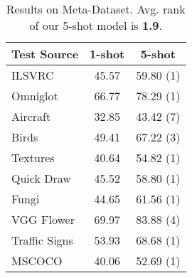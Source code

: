 \documentclass[runningheads]{llncs}
\begin{document}
\begin{table}
\centering
\caption{Results on Meta-Dataset. Avg. rank of our 5-shot model is \textbf{1.9}.}
\begin{tabular}{lcc}
\toprule
Test Source & 1-shot & 5-shot  \\ \midrule
{ILSVRC}          & {45.57}           & {59.80 (1)}                            \\
{Omniglot}        & {66.77}           & {78.29 (1)}                            \\
{Aircraft}        & {32.85}           & {43.42 (7)}                            \\
{Birds}           & {49.41}           & {67.22 (3)}                            \\
{Textures}        & {40.64}           & {54.82 (1)}                            \\
{Quick Draw}       & {45.52}           & {58.80 (1)}                            \\
{Fungi}           & {44.65}           & {61.56 (1)}                            \\ 
{VGG Flower}       & {69.97}           & {83.88 (4)}                            \\
{Traffic Signs}    & {53.93}           & {68.68 (1)}                            \\ 
{MSCOCO}          & {40.06}           & {52.69 (1)}                           \\ \midrule
\end{tabular}
\label{meta-dataset}
\end{table}






\end{document}
